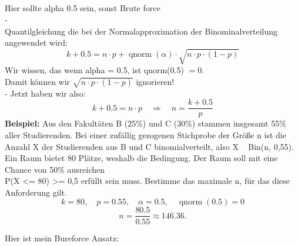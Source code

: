 \subsection{}
\normalsize
\large{\textcolor{red}{\warning} Hier sollte alpha 0.5 sein, sonst 
Brute force \textcolor{red}{\warning}}\\
-\\
\normalsize
Quantilgleichung die bei der Normalapproximation der Binominalverteilung angewendet wird:
\large
\[
k + 0.5 = n \cdot p + \operatorname{qnorm}(\alpha) \cdot \sqrt{n \cdot p \cdot (1-p)}
\]
\normalsize
Wir wissen, das wenn alpha = 0.5, ist qnorm(0.5) $=0$.\\
Damit können wir $\sqrt{n \cdot p \cdot (1-p)}$ ignorieren!\\
- Jetzt haben wir also:\\
\large
\[
k + 0.5 = n \cdot p \quad\Longrightarrow\quad n = \frac{k+0.5}{p}
\]
\normalsize
\large{\textbf{Beispiel:}}
\normalsize
Aus den Fakultäten B (25\%) und C (30\%) stammen insgesamt 55\% aller Studierenden. Bei einer zufällig gezogenen Stichprobe der Größe n ist die Anzahl X der Studierenden aus B und C binomialverteilt, also X ~ Bin(n, 0,55). Ein Raum bietet 80 Plätze, weshalb die Bedingung. Der Raum soll mit eine Chance von 50\% ausreichen\\
P(X <= 80) >= 0,5
erfüllt sein muss. Bestimme das maximale n, für das diese Anforderung gilt.\\
\[
k = 80,\quad p = 0.55,\quad \alpha = 0.5,\quad \operatorname{qnorm}(0.5) = 0
\]\[
n = \frac{80.5}{0.55} \approx 146.36.
\]

Hier ist mein Bureforce Ansatz:
